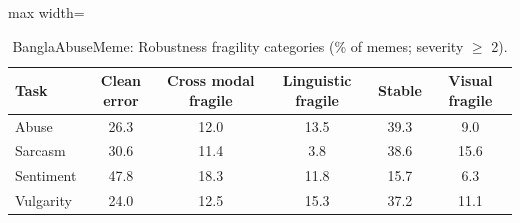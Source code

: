 \begin{table}[t]
\centering
\small
\caption{BanglaAbuseMeme: Robustness fragility categories (\% of memes; severity $\geq$ 2).}
\label{tab:fragility_table_banglaabusememe}
\begin{adjustbox}{max width=\columnwidth}
\begin{tabular}{lccccc}
\toprule
Task & Clean error & Cross modal fragile & Linguistic fragile & Stable & Visual fragile \\
\midrule
Abuse & 26.3 & 12.0 & 13.5 & 39.3 & 9.0 \\
Sarcasm & 30.6 & 11.4 & 3.8 & 38.6 & 15.6 \\
Sentiment & 47.8 & 18.3 & 11.8 & 15.7 & 6.3 \\
Vulgarity & 24.0 & 12.5 & 15.3 & 37.2 & 11.1 \\
\bottomrule
\end{tabular}
\end{adjustbox}
\end{table}
